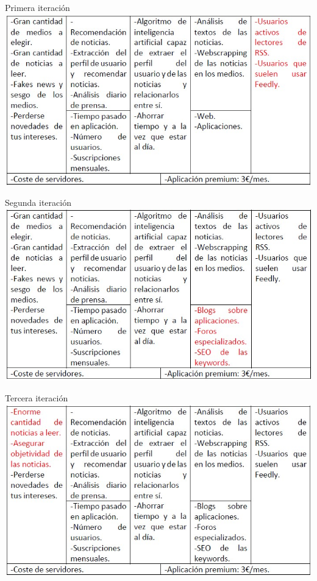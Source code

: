 \documentclass[12pt]{beamer}
\begin{document}
		\begin{frame}{Primera iteración}
            \includegraphics[width=\textwidth,height=0.8\textheight,keepaspectratio]{img/canvas/canvas_it_1}
		\end{frame}

		\begin{frame}{Segunda iteración}
            \includegraphics[width=\textwidth,height=0.8\textheight,keepaspectratio]{img/canvas/canvas_it_2}
		\end{frame}

		\begin{frame}{Tercera iteración}
            \includegraphics[width=\textwidth,height=0.8\textheight,keepaspectratio]{img/canvas/canvas_it_3}
		\end{frame}
\end{document}
